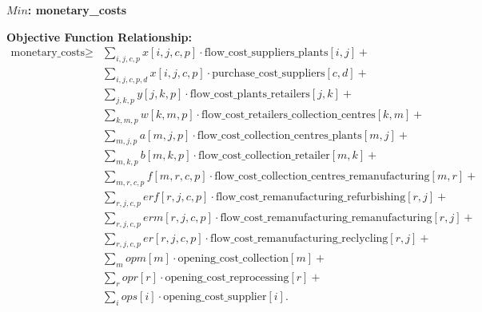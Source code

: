 \documentclass{article}
\begin{document}
    \textbf{\( Min \): monetary\_costs}



    \textbf{Objective Function Relationship:}
    \[
        \begin{aligned}
            \text{monetary\_costs} \geq & \sum_{i,j,c,p} x[i,j,c,p] \cdot \text{flow\_cost\_suppliers\_plants}[i,j] + \\
            & \sum_{i,j,c,p,d} x[i,j,c,p] \cdot \text{purchase\_cost\_suppliers}[c,d] + \\
            & \sum_{j,k,p} y[j,k,p] \cdot \text{flow\_cost\_plants\_retailers}[j,k] + \\
            & \sum_{k,m,p} w[k,m,p] \cdot \text{flow\_cost\_retailers\_collection\_centres}[k,m] + \\
            & \sum_{m,j,p} a[m,j,p] \cdot \text{flow\_cost\_collection\_centres\_plants}[m,j] + \\
            & \sum_{m,k,p} b[m,k,p] \cdot \text{flow\_cost\_collection\_retailer}[m,k] + \\
            & \sum_{m,r,c,p} f[m,r,c,p] \cdot \text{flow\_cost\_collection\_centres\_remanufacturing}[m,r] + \\
            & \sum_{r,j,c,p} erf[r,j,c,p] \cdot \text{flow\_cost\_remanufacturing\_refurbishing}[r,j] + \\
            & \sum_{r,j,c,p} erm[r,j,c,p] \cdot \text{flow\_cost\_remanufacturing\_remanufacturing}[r,j] + \\
            & \sum_{r,j,c,p} er[r,j,c,p] \cdot \text{flow\_cost\_remanufacturing\_reclycling}[r,j] + \\
            & \sum_m opm[m] \cdot \text{opening\_cost\_collection}[m] + \\
            & \sum_r opr[r] \cdot \text{opening\_cost\_reprocessing}[r] + \\
            & \sum_i ops[i] \cdot \text{opening\_cost\_supplier}[i].
        \end{aligned}
    \]
\end{document}
